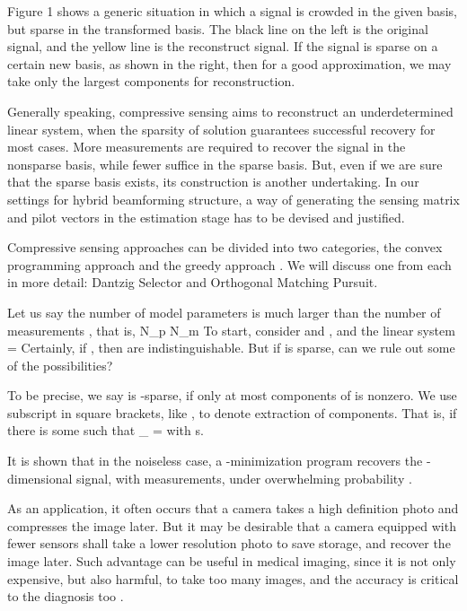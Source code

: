Figure 1 shows a generic situation in which a signal is crowded in the given basis, but sparse in the transformed basis.
The black line on the left is the original signal, and the yellow line is the reconstruct signal.
If the signal is sparse on a certain new basis, as shown in the right, then for a good approximation, we may take only the largest components for reconstruction.

Generally speaking, compressive sensing aims to reconstruct an underdetermined linear system, when the sparsity of solution guarantees successful recovery for most cases.
More measurements are required to recover the signal in the nonsparse basis, while fewer suffice in the sparse basis.
But, even if we are sure that the sparse basis exists, its construction is another undertaking.
In our settings for hybrid beamforming structure, a way of generating the sensing matrix and pilot vectors in the estimation stage has to be devised and justified.

Compressive sensing approaches can be divided into two categories, the convex programming approach and the greedy approach \cite {RDD18}.
We will discuss one from each in more detail: Dantzig Selector and Orthogonal Matching Pursuit.

Let us say the number of model parameters  is much larger than the number of measurements , that is,
%
 {
N_p \gg N_m 
}
%
To start, consider  and , and the linear system
%
 {
=  
}
Certainly, if , then  are indistinguishable.
But if  is sparse, can we rule out some of the possibilities?

To be precise, we say  is -sparse, if only at most  components of  is nonzero.
We use subscript in square brackets, like , to denote extraction of components.
That is, if there is some  such that
%
 {
 _{}
= 
}
%
with
%
 {
 \leq s. 
}

It is shown that in the noiseless case, a -minimization program recovers the -dimensional signal, with  measurements, under overwhelming probability \cite {Can05}.

As an application, it often occurs that a camera takes a high definition photo and compresses the image later.
But it may be desirable that a camera equipped with fewer sensors shall take a lower resolution photo to save storage, and recover the image later.
Such advantage can be useful in medical imaging, since it is not only expensive, but also harmful, to take too many images, and the accuracy is critical to the diagnosis too \cite {CaT07}.



